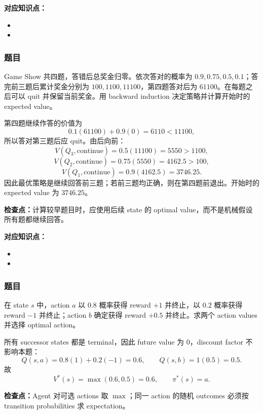 \clearpage
{}

\textbf{对应知识点：}
\begin{itemize}
  \item {}
  \item {}
\end{itemize}

\subsubsection*{题目}

Game Show 共四题，答错后总奖金归零。依次答对的概率为 $0.9,0.75,0.5,0.1$；答完前三题后累计奖金分别为 $100,1100,11100$，第四题答对后为 $61100$。在每题之后可以 quit 并保留当前奖金。用 backward induction 决定策略并计算开始时的 expected value。

\begin{checkedsolution}
第四题继续作答的价值为
\[
  0.1(61100)+0.9(0)=6110<11100,
\]
所以答对第三题后应 quit。由后向前：
\[
  V(Q_3,\text{continue})=0.5(11100)=5550>1100,
\]
\[
  V(Q_2,\text{continue})=0.75(5550)=4162.5>100,
\]
\[
  V(Q_1,\text{continue})=0.9(4162.5)=3746.25.
\]
因此最优策略是继续回答前三题；若前三题均正确，则在第四题前退出。开始时的 expected value 为 $3746.25$。
\end{checkedsolution}

\textbf{检查点：}计算较早题目时，应使用后续 state 的 optimal value，而不是机械假设所有题都继续回答。

\clearpage
{}

\textbf{对应知识点：}
\begin{itemize}
  \item {}
  \item {}
\end{itemize}

\subsubsection*{题目}

在 state $s$ 中，action $a$ 以 $0.8$ 概率获得 reward $+1$ 并终止，以 $0.2$ 概率获得 reward $-1$ 并终止；action $b$ 确定获得 reward $+0.5$ 并终止。求两个 action values 并选择 optimal action。

\begin{checkedsolution}
所有 successor states 都是 terminal，因此 future value 为 $0$，discount factor 不影响本题：
\[
  Q(s,a)=0.8(1)+0.2(-1)=0.6,
  \qquad Q(s,b)=1(0.5)=0.5.
\]
故
\[
  V^*(s)=\max(0.6,0.5)=0.6,
  \qquad \pi^*(s)=a.
\]
\end{checkedsolution}

\textbf{检查点：}Agent 对可选 actions 取 $\max$；同一 action 的随机 outcomes 必须按 transition probabilities 求 expectation。
